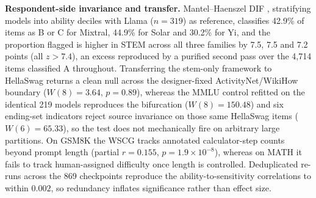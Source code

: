 \textbf{Respondent-side invariance and transfer.} Mantel--Haenszel DIF \citep{holland1988,dorans1993}, stratifying models into ability deciles with Llama ($n = 319$) as reference, classifies 42.9\% of items as B or C for Mixtral, 44.9\% for Solar and 30.2\% for Yi, and the proportion flagged is higher in STEM across all three families by 7.5, 7.5 and 7.2 points (all $z > 7.4$), an excess reproduced by a purified second pass over the 4,714 items classified A throughout. Transferring the stem-only framework to HellaSwag \citep{zellers2019} returns a clean null across the designer-fixed ActivityNet/WikiHow boundary ($W(8) = 3.64$, $p = 0.89$), whereas the MMLU control refitted on the identical 219 models reproduces the bifurcation ($W(8) = 150.48$) and six ending-set indicators reject source invariance on those same HellaSwag items ($W(6) = 65.33$), so the test does not mechanically fire on arbitrary large partitions. On GSM8K \citep{cobbe2021} the WSCG tracks annotated calculator-step counts beyond prompt length (partial $r = 0.155$, $p = 1.9 \times 10^{-8}$), whereas on MATH \citep{hendrycks2021math} it fails to track human-assigned difficulty once length is controlled. Deduplicated re-runs across the 869 checkpoints reproduce the ability-to-sensitivity correlations to within $0.002$, so redundancy inflates significance rather than effect size.
